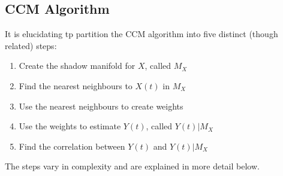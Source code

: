 \documentclass[a4paper,11pt]{article}
\begin{document}
\subsection{CCM Algorithm}
It is elucidating tp partition the CCM algorithm into five distinct (though related) steps:
\begin{enumerate}
\item Create the shadow manifold for $X$, called $M_X$
\item Find the nearest neighbours to $X(t)$ in $M_X$
\item Use the nearest neighbours to create weights
\item Use the weights to estimate $Y(t)$, called $Y(t)|M_X$
\item Find the correlation between $Y(t)$ and $Y(t)|M_X$ 
\end{enumerate}
The steps vary in complexity and are explained in more detail below.
\end{document}
